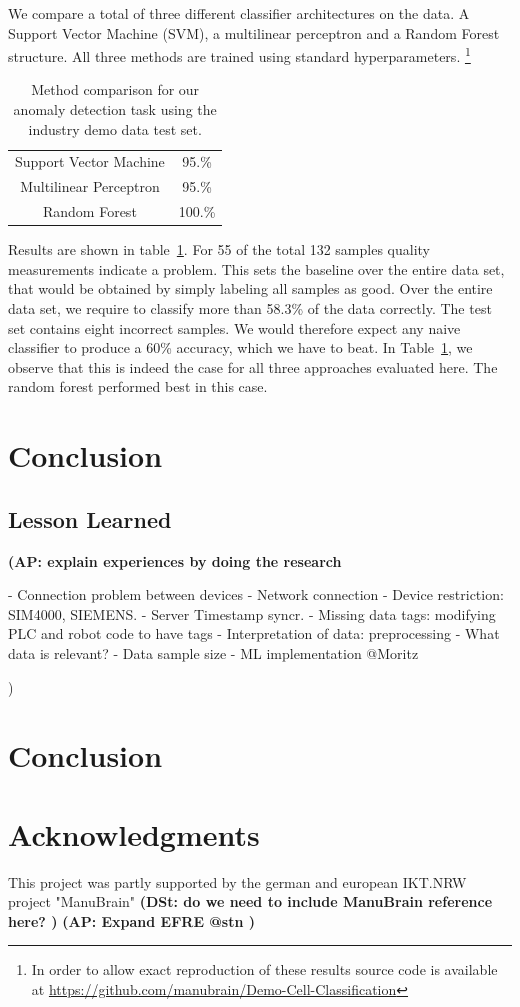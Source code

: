 \documentclass[5p,times,procedia]{elsarticle}
\newcommand{\AP}[1]{{\color{blue} {\bf (AP: #1)}}}
\newcommand{\DSt}[1]{{\color{orange} {\bf (DSt: #1)}}}
\begin{document}
We compare a total of three different classifier architectures on the data.
A Support Vector Machine (SVM), a multilinear perceptron and a Random Forest
structure. All three methods are trained using standard hyperparameters.
\footnote{In order to allow exact reproduction of these results source
code is available at \url{https://github.com/manubrain/Demo-Cell-Classification}}
\begin{table}
       \centering
       \begin{tabular}{ c c }
              Support Vector Machine & 95.\% \\
              Multilinear Perceptron & 95.\% \\
              Random Forest          & 100.\%
       \end{tabular}
       \caption{Method comparison for our anomaly detection task 
                using the industry demo data test set.}
       \label{tab:class_comp}
\end{table}
Results are shown in table~\ref{tab:class_comp}. For 55 of the total 132 samples
quality measurements indicate a problem. This sets the 
baseline over the entire data set, that would be obtained by simply labeling all samples
as good. Over the entire data set, we require to classify more than 58.3\% of the data correctly.
The test set contains eight incorrect samples. We would therefore expect any naive classifier
to produce a 60\% accuracy, which we have to beat. In Table~\ref{tab:class_comp},
we observe that this is indeed the case for all three approaches evaluated here.
The random forest performed best in this case.

\section{Conclusion}

\subsection{Lesson Learned} %

\AP{explain experiences by doing the research

- Connection problem between devices
   - Network connection
   - Device restriction: SIM4000, SIEMENS. 
   - Server Timestamp syncr.
- Missing data tags: modifying PLC and robot code to have tags
- Interpretation of data: preprocessing
   - What data is relevant?
- Data sample size
- ML implementation @Moritz


}

\section{Conclusion} %

\section*{Acknowledgments}
This project was partly supported by the german and european IKT.NRW
project "ManuBrain"
\DSt{
do we need to include ManuBrain reference here?
}
\AP{
Expand EFRE @stn
}



\end{document}
